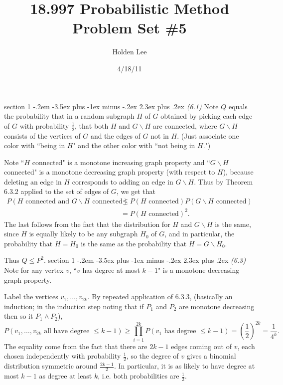 \documentclass[12pt]{article}
\makeatletter
\theoremstyle{norm}
\newcommand{\rc}[1]{\frac{1}{#1}}
\newcommand{\pa}[1]{\left( {#1} \right)}
\newcommand{\pf}[2]{\pa{\frac{#1}{#2}}}
\newcommand{\bs}[0]{\backslash}
\newenvironment{problem}{\@startsection
       {section}
       {1}
       {-.2em}
       {-3.5ex plus -1ex minus -.2ex}
       {2.3ex plus .2ex}
       {\pagebreak[3]%
       \large\bf\noindent{Problem }
       }
       }
       {%
       }
\makeatother
\begin{document}
\title{18.997 Probabilistic Method Problem Set \#5}%
\author{Holden Lee}
\date{4/18/11}%
\maketitle
\thispagestyle{empty}

\begin{problem}{\it(6.1)}
Note $Q$ equals the probability that in a random subgraph $H$ of $G$ obtained by picking each edge of $G$ with probability $\rc2$, that both $H$ and $G\bs H$ are connected, where $G\bs H$ consists of the vertices of $G$ and the edges of $G$ not in $H$. (Just associate one color with ``being in $H$" and the  other color with ``not being in $H$.")

Note ``$H$ connected" is a monotone increasing graph property and ``$G\bs H$ connected" is a monotone decreasing graph property (with respect to $H$), because deleting an edge in $H$ corresponds to adding an edge in $G\bs H$. Thus by Theorem 6.3.2 applied to the set of edges of $G$, we get that
\begin{align*}
P(H\text{ connected  and }G\bs H\text{ connected})
&\le P(H\text{ connected})P(G\bs H\text{ connected})\\
&=P(H\text{ connected})^2.
\end{align*}
The last follows from the fact that the distribution for $H$ and $G\bs H$ is the same, since $H$ is equally likely to be any subgraph $H_0$ of $G$, and in particular, the probability that $H=H_0$ is the same as the probability that $H=G\bs H_0$.

Thus $Q\le P^2$.
\end{problem}
\begin{problem}{\it (6.3)}
Note for any vertex $v$, ``$v$ has degree at most $k-1$" is a monotone decreasing graph property. 

Label the vertices $v_1,\ldots, v_{2k}$. By repeated application of 6.3.3, (basically an induction; in the induction step noting that if $P_1$ and $P_2$ are monotone decreasing then so it $P_1\wedge P_2$),
\[
P(v_1,\ldots,v_{2k}\text{ all have degree }\le k-1)\ge
\prod_{i=1}^{2k} P(v_1\text{ has degree }\le k-1)=\pf12^{2k}=\rc{4^k}.
\]
The equality come from the fact that there are $2k-1$ edges coming out of $v$, each chosen independently with probability $\rc 2$, so the degree of $v$ gives a binomial distribution symmetric around $\frac{2k-1}{2}$. In particular, it is as likely to have degree at most $k-1$ as degree at least $k$, i.e. both probabilities are $\rc2$.
\end{problem}
\end{document}
